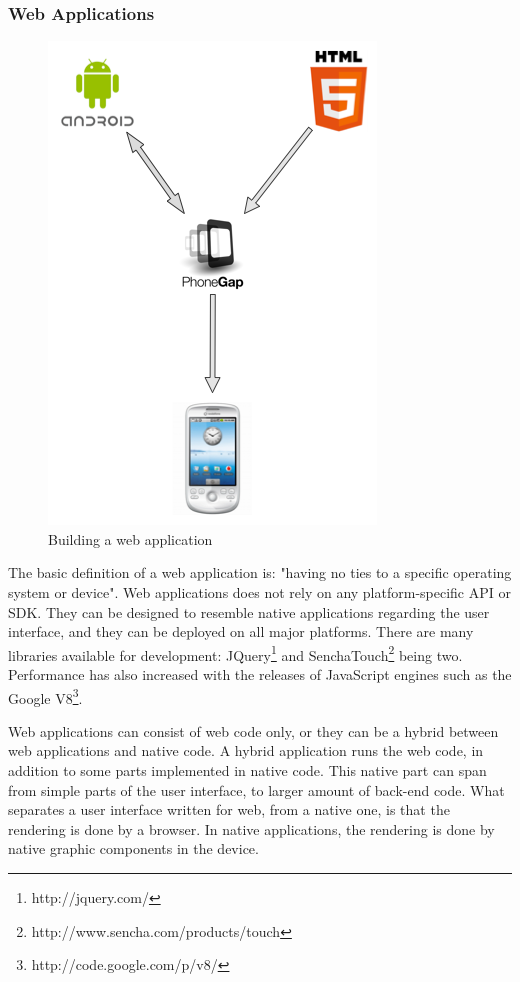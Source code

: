 \subsubsection {Web Applications}
\begin{figure}
  \begin{center}
    \includegraphics[scale=0.25]{Technologies/phonegapfigure.png}
  \end{center}
  \caption{Building a web application}
\end{figure}
The basic definition of a web application is: "having no ties to a specific operating system or device". Web applications does not rely on any platform-specific API or SDK. They can be designed to resemble native applications regarding the user interface, and they can be deployed on all major platforms. There are many libraries available for development: JQuery\footnote{http://jquery.com/} and SenchaTouch\footnote{http://www.sencha.com/products/touch} being two. Performance has also increased with the releases of JavaScript engines such as the Google V8\footnote{http://code.google.com/p/v8/}. 

Web applications can consist of web code only, or they can be a hybrid between web applications and native code.  A hybrid application runs the web code, in addition to some parts implemented in native code. This native part can span from simple parts of the user interface, to larger amount of back-end code. What separates a user interface written for web, from a native one, is that the rendering is done by a browser. In native applications, the rendering is done by native graphic components in the device.

